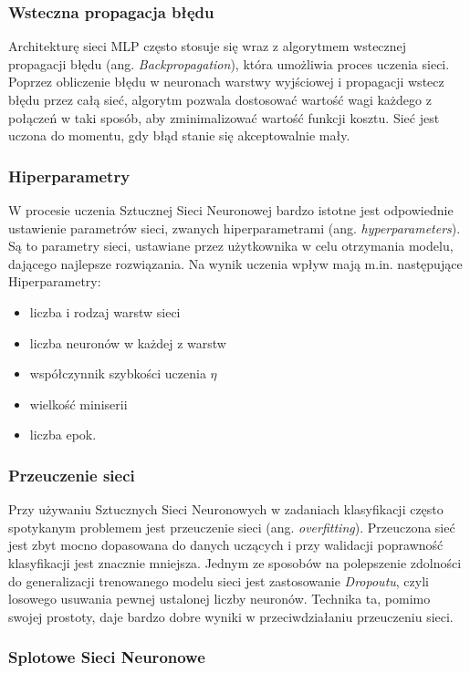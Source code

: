 \subsubsection{Wsteczna propagacja błędu}
Architekturę sieci MLP często stosuje się wraz z algorytmem wstecznej 
propagacji błędu (ang. \emph{Backpropagation}), która umożliwia proces uczenia sieci. Poprzez obliczenie błędu w neuronach warstwy wyjściowej i propagacji wstecz błędu przez całą sieć, algorytm pozwala dostosować wartość wagi każdego z połączeń w taki sposób, aby zminimalizować wartość funkcji kosztu. Sieć jest uczona do momentu, gdy błąd stanie się akceptowalnie mały. 

\subsubsection{Hiperparametry}
W procesie uczenia Sztucznej Sieci Neuronowej bardzo istotne jest odpowiednie ustawienie parametrów sieci, zwanych hiperparametrami (ang. \emph{hyperparameters}). Są to parametry sieci, ustawiane przez użytkownika w celu otrzymania modelu, dającego najlepsze rozwiązania. Na wynik uczenia wpływ mają m.in. następujące Hiperparametry:
\begin{itemize}
  \item liczba i rodzaj warstw sieci
  \item liczba neuronów w każdej z warstw
  \item współczynnik szybkości uczenia $\eta$
  \item wielkość miniserii
  \item liczba epok.
\end{itemize}

\subsubsection{Przeuczenie sieci}

Przy używaniu Sztucznych Sieci Neuronowych w zadaniach klasyfikacji często spotykanym problemem jest przeuczenie sieci (ang. \emph{overfitting}). Przeuczona sieć jest zbyt mocno dopasowana do danych uczących i przy walidacji poprawność klasyfikacji jest znacznie mniejsza. Jednym ze sposobów na polepszenie zdolności do generalizacji trenowanego modelu sieci jest zastosowanie \emph{Dropoutu}, czyli losowego usuwania pewnej ustalonej liczby neuronów. Technika ta, pomimo swojej prostoty, daje bardzo dobre wyniki w przeciwdziałaniu przeuczeniu sieci.  


\subsubsection{Splotowe Sieci Neuronowe}

